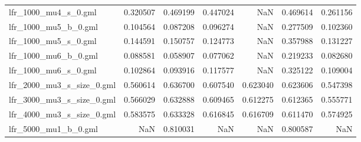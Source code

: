 \begin{tabular}{lrrrrrr}
lfr\_1000\_mu4\_s\_0.gml       &                            0.320507 &                       0.469199 &                          0.447024 &                           NaN &                        0.469614 &                                0.261156 \\
lfr\_1000\_mu5\_b\_0.gml       &                            0.104564 &                       0.087208 &                          0.096274 &                           NaN &                        0.277509 &                                0.102360 \\
lfr\_1000\_mu5\_s\_0.gml       &                            0.144591 &                       0.150757 &                          0.124773 &                           NaN &                        0.357988 &                                0.131227 \\
lfr\_1000\_mu6\_b\_0.gml       &                            0.088581 &                       0.058907 &                          0.077062 &                           NaN &                        0.219233 &                                0.082680 \\
lfr\_1000\_mu6\_s\_0.gml       &                            0.102864 &                       0.093916 &                          0.117577 &                           NaN &                        0.325122 &                                0.109004 \\
lfr\_2000\_mu3\_s\_size\_0.gml  &                            0.560614 &                       0.636700 &                          0.607540 &                      0.623040 &                        0.623606 &                                0.547398 \\
lfr\_3000\_mu3\_s\_size\_0.gml  &                            0.566029 &                       0.632888 &                          0.609465 &                      0.612275 &                        0.612365 &                                0.555771 \\
lfr\_4000\_mu3\_s\_size\_0.gml  &                            0.583575 &                       0.633328 &                          0.616845 &                      0.616709 &                        0.611470 &                                0.574925 \\
lfr\_5000\_mu1\_b\_0.gml       &                                 NaN &                       0.810031 &                               NaN &                           NaN &                        0.800587 &                                     NaN \\

\end{tabular}
